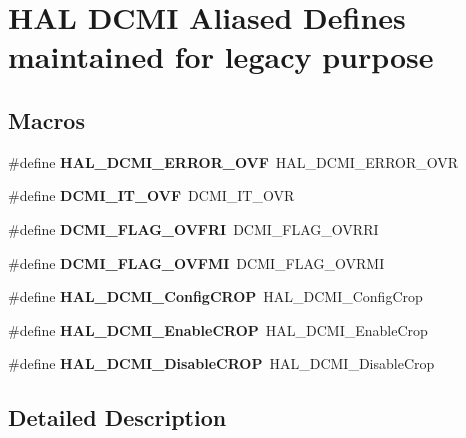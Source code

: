 \hypertarget{group___h_a_l___d_c_m_i___aliased___defines}{}\section{H\+AL D\+C\+MI Aliased Defines maintained for legacy purpose}
\label{group___h_a_l___d_c_m_i___aliased___defines}
\subsection*{Macros}
\begin{DoxyCompactItemize}
\item 
\mbox{\label{group___h_a_l___d_c_m_i___aliased___defines_ga5aea0676cf18867facb28620b5818396}} 
\#define {\bfseries H\+A\+L\+\_\+\+D\+C\+M\+I\+\_\+\+E\+R\+R\+O\+R\+\_\+\+O\+VF}~H\+A\+L\+\_\+\+D\+C\+M\+I\+\_\+\+E\+R\+R\+O\+R\+\_\+\+O\+VR
\item 
\mbox{\label{group___h_a_l___d_c_m_i___aliased___defines_ga5afbb2e1a8b64d9e042da18d8304667e}} 
\#define {\bfseries D\+C\+M\+I\+\_\+\+I\+T\+\_\+\+O\+VF}~D\+C\+M\+I\+\_\+\+I\+T\+\_\+\+O\+VR
\item 
\mbox{\label{group___h_a_l___d_c_m_i___aliased___defines_ga10e986f24ca3e73d31f56ddd908987e0}} 
\#define {\bfseries D\+C\+M\+I\+\_\+\+F\+L\+A\+G\+\_\+\+O\+V\+F\+RI}~D\+C\+M\+I\+\_\+\+F\+L\+A\+G\+\_\+\+O\+V\+R\+RI
\item 
\mbox{\label{group___h_a_l___d_c_m_i___aliased___defines_gaec0c82ddcc3994b877a2f904c680e2b1}} 
\#define {\bfseries D\+C\+M\+I\+\_\+\+F\+L\+A\+G\+\_\+\+O\+V\+F\+MI}~D\+C\+M\+I\+\_\+\+F\+L\+A\+G\+\_\+\+O\+V\+R\+MI
\item 
\mbox{\label{group___h_a_l___d_c_m_i___aliased___defines_ga97e4484879b160cdbd78136b4bf00e4c}} 
\#define {\bfseries H\+A\+L\+\_\+\+D\+C\+M\+I\+\_\+\+Config\+C\+R\+OP}~H\+A\+L\+\_\+\+D\+C\+M\+I\+\_\+\+Config\+Crop
\item 
\mbox{\label{group___h_a_l___d_c_m_i___aliased___defines_ga8503dfb94edec53caaa40b98e0853c82}} 
\#define {\bfseries H\+A\+L\+\_\+\+D\+C\+M\+I\+\_\+\+Enable\+C\+R\+OP}~H\+A\+L\+\_\+\+D\+C\+M\+I\+\_\+\+Enable\+Crop
\item 
\mbox{\label{group___h_a_l___d_c_m_i___aliased___defines_ga508db44d186de33245decc10be6ab0f2}} 
\#define {\bfseries H\+A\+L\+\_\+\+D\+C\+M\+I\+\_\+\+Disable\+C\+R\+OP}~H\+A\+L\+\_\+\+D\+C\+M\+I\+\_\+\+Disable\+Crop
\end{DoxyCompactItemize}


\subsection{Detailed Description}
